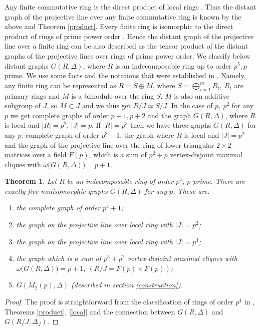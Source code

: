 \documentclass[12pt,a4paper]{article}
\newtheorem{theorem}{Theorem}
\theoremstyle{definition}
\begin{document}
Any finite commutative ring is the direct product of local rings \cite[VI.2]{mcd}. Thus the distant graph of the projective line over any finite commutative ring is known by the above and Theorem \ref{product}.\newline
Every finite ring is isomorphic to the direct product of rings of prime power order \cite[I.1]{mcd}. Hence the distant graph of the projective line over a finite ring can be also described as the tensor product of the distant graphs of the projective lines over rings of prime power order.\newline 
We classify below distant graphs $G(R, \Delta)$, where  $R$ is an indecomposable ring up to order $p^5, p$ prime.
We use some facts and the notations that were established in \cite{p5}. Namely, any finite ring can be represented as $R=S\oplus M$, where $S=\bigoplus_{i=1}^mR_i, \ R_i$ are primary rings and $M$ is a bimodule over the ring $S$. $M$ is also an additive subgroup of $J$, so $M\subset J$ and we thus get $R/J\simeq S/J$.\newline
In the case of $p, \ p^2$ for any $p$ we get complete graphs of order $p+1, p+2$ and the graph $G(R, \Delta)$, where $R$ is local and $|R|=p^2$, $|J|=p$. 
If $|R|=p^3$ then we have three graphs $G(R, \Delta)$ for any $p$: complete graph of order $p^3+1$, the graph where $R$ is local and $|J|=p^2$ and the graph of the projective line over the ring of lower triangular $2\times 2$-matrices over a field $F(p)$, which is a sum of $p^2+p$ vertex-disjoint maximal cliques with  $\omega\bigl(G(R, \Delta)\bigr)=p+1$.
\begin{theorem}
Let $R$ be an indecomposable ring of order $p^4, \ p$ prime. There are exactly five nonisomorphic graphs $G(R, \Delta)$ for any $p$. These are: 
\begin{enumerate}
\item the complete graph of order  $p^4+1$;
\item the graph on the projective line over local ring with $|J|=p^2$;
\item the graph on the projective line over local ring with $|J|=p^3$;
\item the graph which is a sum of $p^3+p^2$ vertex-disjoint maximal cliques with $\omega\bigl(G(R, \Delta)\bigr)=p+1$, $(R/J=F(p)\times F(p))$;
\item $G(M_2(p), \Delta)$ (described in section {\rm \ref{construction}}).
\end{enumerate}
\end{theorem}
\begin{proof}
The proof is straightforward from the classification of rings of order $p^4$ in \cite{p4, p5},  Theorems \ref{product}, \ref{local} and the connection between $G(R, \Delta)$ and $G(R/J, \Delta_J)$.
\end{proof}
\end{document}
